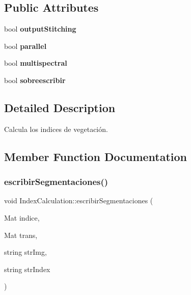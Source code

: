 \subsection*{Public Attributes}
\begin{DoxyCompactItemize}
\item 
\mbox{\label{classIndexCalculation_a2a1ce2e6437e6bd929cf6f975876e4ca}} 
bool {\bfseries output\+Stitching}
\item 
\mbox{\label{classIndexCalculation_a6b0355c3158fd94f6e0d9fa6d06f4634}} 
bool {\bfseries parallel}
\item 
\mbox{\label{classIndexCalculation_ab8b7a39b981cacd16e8bbbe1e680cc7a}} 
bool {\bfseries multispectral}
\item 
\mbox{\label{classIndexCalculation_a830090130362271d6732a770f99e23ce}} 
bool {\bfseries sobreescribir}
\end{DoxyCompactItemize}


\subsection{Detailed Description}
Calcula los indices de vegetación. 

\subsection{Member Function Documentation}
\mbox{\label{classIndexCalculation_acb0a9e1ded8f0d9550e7dad18e66058c}} 
\subsubsection{\texorpdfstring{escribir\+Segmentaciones()}{escribirSegmentaciones()}}
{\footnotesize\ttfamily void Index\+Calculation\+::escribir\+Segmentaciones (\begin{DoxyParamCaption}\item[{Mat}]{indice,  }\item[{Mat}]{trans,  }\item[{string}]{str\+Img,  }\item[{string}]{str\+Index }\end{DoxyParamCaption})\hspace{0.3cm}{\ttfamily [inline]}}



